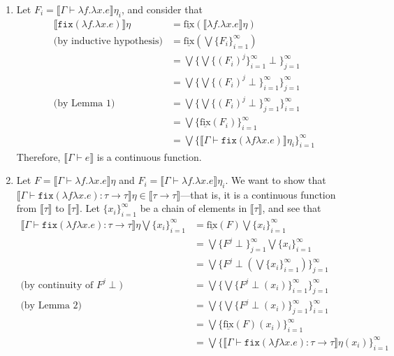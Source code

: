 \documentclass{westhesis}
\begin{document}
\begin{itemize}
 \begin{enumerate}
\item Let $F_i = \llbracket \Gamma \vdash \lambda f. \lambda x.e\rrbracket\eta_i$, and consider that 
 \begin{align*}
 \llbracket \texttt{fix} (\lambda f.\lambda x.e)\rrbracket\eta &= \underline{\text{fix}}(\llbracket \lambda f. \lambda x.e 
 \rrbracket\eta)\\
 \text{(by inductive hypothesis)} &= \underline{\text{fix}}(\bigvee\{F_i\}^{\infty}_{i=1}) \\
 &= \bigvee\{\bigvee\{(F_i)^j \}^{\infty}_{i=1}\perp\}^{\infty}_{j=1} \\
 &= \bigvee\{\bigvee\{(F_i)^j \perp\}^{\infty}_{i=1}\}^{\infty}_{j=1} \\ 
\text{(by Lemma 1)} &= \bigvee\{\bigvee\{(F_i)^j \perp\}^{\infty}_{j=1}\}^{\infty}_{i=1} \\ 
&= \bigvee\{\underline{\text{fix}}(F_i)\}^{\infty}_{i=1}\\
&= \bigvee\{\llbracket \Gamma \vdash \texttt{fix}(\lambda f \lambda x.e)\rrbracket\eta_i\}^{\infty}_{i=1}
 \end{align*}
 Therefore, $\llbracket \Gamma \vdash e \rrbracket$ is a continuous function.
 \item Let $F = \llbracket \Gamma \vdash \lambda f. \lambda x.e\rrbracket\eta$ and $F_i = \llbracket \Gamma \vdash \lambda 
 f. \lambda x.e\rrbracket\eta_i$. We want to show that $\llbracket\Gamma\vdash\texttt{fix}(\lambda f \lambda x.e) : \tau 
 \rightarrow\tau\rrbracket\eta \in \llbracket \tau \rightarrow \tau \rrbracket$---that is, it is a continuous function from $\llbracket 
 \tau \rrbracket$ to $\llbracket \tau \rrbracket$. Let $\{x_i\}^{\infty}_{i=1}$ be a chain of elements in $\llbracket \tau \rrbracket$,
  and see that 
 \begin{align*}
 \llbracket\Gamma\vdash\texttt{fix}(\lambda f \lambda x.e) : \tau \rightarrow\tau\rrbracket\eta \bigvee\{x_i\}^{\infty}_{i=1}&= 
 \underline{\text{fix}}(F)\bigvee\{x_i\}^{\infty}_{i=1}\\
 &=\bigvee\{F^j \perp\}^{\infty}_{j=1}\bigvee\{x_i\}^{\infty}_{i=1}\\
 &= \bigvee\{F^j \perp(\bigvee\{x_i\}^{\infty}_{i=1})\}^{\infty}_{j=1}\\ 
 \text{(by continuity of $F^j \perp$) }&= \bigvee\{\bigvee\{F^j \perp(x_i)\}^{\infty}_{i=1}\}^{\infty}_{j=1}\\ 
 \text{(by Lemma 2)} &=\bigvee\{\bigvee\{F^j \perp(x_i)\}^{\infty}_{j=1}\}^{\infty}_{i=1}\\
 &= \bigvee\{\underline{\text{fix}}(F)(x_i)\}^{\infty}_{i=1}\\
 &= \bigvee\{\llbracket\Gamma\vdash\texttt{fix}(\lambda f \lambda x.e) : \tau \rightarrow\tau\rrbracket\eta(x_i)\}^{\infty}_{i=1}\\
 \end{align*}
 \end{enumerate}
 \end{itemize}
\end{document}
